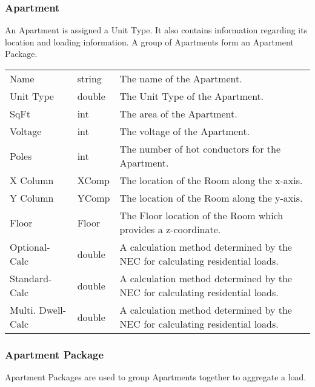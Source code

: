 \documentclass[letterpaper,10pt,english]{sphinxmanual}
\begin{document}
\subsubsection{Apartment}
\label{\detokenize{docs/definitions/index-definitions:apartment}}\label{\detokenize{docs/definitions/index-definitions:apartment-definition}}
An Apartment is assigned a Unit Type.  It also contains information regarding its location and loading information.  A group of Apartments form an Apartment Package.


\begin{savenotes}\sphinxattablestart
\centering
\begin{tabulary}{\linewidth}[t]{|T|T|T|}
\hline
\sphinxstyletheadfamily 
{}
&\sphinxstyletheadfamily 
{}
&\sphinxstyletheadfamily 
{}
\\
\hline
Name
&
string
&
The name of the Apartment.
\\
\hline
Unit Type
&
double
&
The Unit Type of the Apartment.
\\
\hline
SqFt
&
int
&
The area of the Apartment.
\\
\hline
Voltage
&
int
&
The voltage of the Apartment.
\\
\hline
Poles
&
int
&
The number of hot conductors for the Apartment.
\\
\hline
X Column
&
XComp
&
The location of the Room along the x-axis.
\\
\hline
Y Column
&
YComp
&
The location of the Room along the y-axis.
\\
\hline
Floor
&
Floor
&
The Floor location of the Room which provides a z-coordinate.
\\
\hline
Optional-Calc
&
double
&
A calculation method determined by the NEC for calculating residential loads.
\\
\hline
Standard-Calc
&
double
&
A calculation method determined by the NEC for calculating residential loads.
\\
\hline
Multi. Dwell-Calc
&
double
&
A calculation method determined by the NEC for calculating residential loads.
\\
\hline
\end{tabulary}
\par
\sphinxattableend\end{savenotes}


\subsubsection{Apartment Package}
\label{\detokenize{docs/definitions/index-definitions:apartment-package}}\label{\detokenize{docs/definitions/index-definitions:apartment-package-definition}}
Apartment Packages are used to group Apartments together to aggregate a load.
\end{document}
